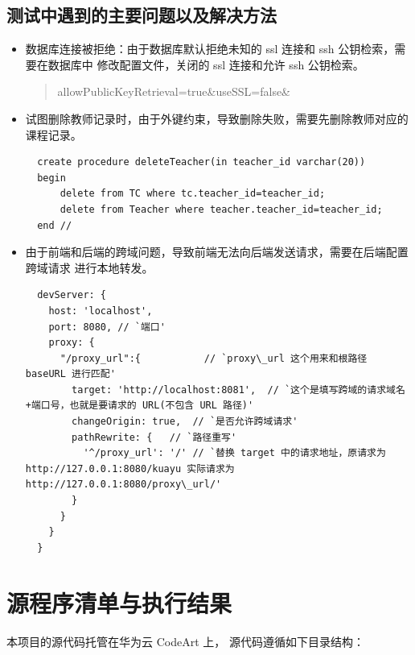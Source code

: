 \documentclass[12pt, a4paper]{article}
\begin{document}
\subsection{测试中遇到的主要问题以及解决方法}
\begin{itemize}
  \item 数据库连接被拒绝：由于数据库默认拒绝未知的 ssl 连接和 ssh 公钥检索，需要在数据库中
        修改配置文件，关闭的 ssl 连接和允许 ssh 公钥检索。
        \begin{quotation}
          allowPublicKeyRetrieval=true\&useSSL=false\&
        \end{quotation}
  \item 试图删除教师记录时，由于外键约束，导致删除失败，需要先删除教师对应的课程记录。
        \begin{lstlisting}
  create procedure deleteTeacher(in teacher_id varchar(20))
  begin
      delete from TC where tc.teacher_id=teacher_id;
      delete from Teacher where teacher.teacher_id=teacher_id;
  end //
        \end{lstlisting}
  \item 由于前端和后端的跨域问题，导致前端无法向后端发送请求，需要在后端配置跨域请求
        进行本地转发。
        \begin{lstlisting}
  devServer: {
    host: 'localhost',
    port: 8080, // `端口'
    proxy: {
      "/proxy_url":{           // `proxy\_url 这个用来和根路径 baseURL 进行匹配'
        target: 'http://localhost:8081',  // `这个是填写跨域的请求域名+端口号，也就是要请求的 URL(不包含 URL 路径)'
        changeOrigin: true,  // `是否允许跨域请求'
        pathRewrite: {   // `路径重写'
          '^/proxy_url': '/' // `替换 target 中的请求地址，原请求为 http://127.0.0.1:8080/kuayu 实际请求为 http://127.0.0.1:8080/proxy\_url/'
        }
      }
    }
  }        
        \end{lstlisting}
\end{itemize}


\section{源程序清单与执行结果}
本项目的源代码托管在华为云 CodeArt 上， 源代码遵循如下目录结构：
\newpage
\end{document}
